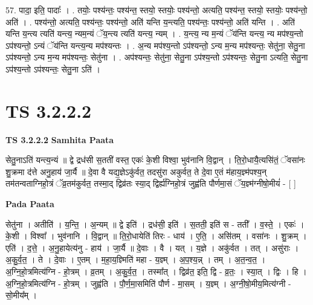 \documentclass[17pt]{extarticle}
\begin{document}
57. पादा॒ इति॒ पादाः᳚ । . तयोः॒ पश्य॑न्तः॒ पश्य॑न्त॒ स्तयो॒ स्तयोः॒ पश्य॑न्तो॒ अत्यति॒ पश्य॑न्त॒ स्तयो॒ स्तयोः॒ पश्य॑न्तो॒ अति॑ । . पश्य॑न्तो॒ अत्यति॒ पश्य॑न्तः॒ पश्य॑न्तो॒ अति॑ यन्ति य॒न्त्यति॒ पश्य॑न्तः॒ पश्य॑न्तो॒ अति॑ यन्ति । . अति॑ यन्ति य॒न्त्य त्यति॑ यन्त्य॒ न्यम॒न्यं ॅय॒न्त्य त्यति॑ यन्त्य॒ न्यम् । . य॒न्त्य॒ न्य म॒न्यं ॅय॑न्ति यन्त्य॒ न्य मप॑श्य॒न्तो ऽप॑श्यन्तो॒ ऽन्यं ॅय॑न्ति यन्त्य॒न्य मप॑श्यन्तः । . अ॒न्य मप॑श्य॒न्तो ऽप॑श्यन्तो॒ ऽन्य म॒न्य मप॑श्यन्तः॒ सेतु॑ना॒ सेतु॒ना ऽप॑श्यन्तो॒ ऽन्य म॒न्य मप॑श्यन्तः॒ सेतु॑ना । . अप॑श्यन्तः॒ सेतु॑ना॒ सेतु॒ना ऽप॑श्य॒न्तो ऽप॑श्यन्तः॒ सेतु॒ना ऽत्यति॒ सेतु॒ना ऽप॑श्य॒न्तो ऽप॑श्यन्तः॒ सेतु॒ना ऽति॑ । \newline
\pagebreak
{}

\section{ TS 3.2.2.2 }

\textbf{TS 3.2.2.2 } \newline
\textbf{Samhita Paata} \newline

सेतु॒नाऽति॑ यन्त्य॒न्यं ॥ द्वे द्रध॑सी स॒तती॑ वस्त॒ एकः॑ के॒शी विश्वा॒ भुव॑नानि वि॒द्वान् । ति॒रो॒धायै॒त्यसि॑तं॒ ॅवसा॑नः शु॒क्रमा द॑त्ते अनु॒हाय॑ जा॒र्यै ॥ दे॒वा वै यद्य॒ज्ञेऽकु॑र्वत॒ तदसु॑रा अकुर्वत॒ ते दे॒वा ए॒तं म॑हाय॒ज्ञ्म॑पश्य॒न् तम॑तन्वताग्निहो॒त्रं ॅव्र॒तम॑कुर्वत॒ तस्मा॒द् द्विव्र॑तः स्या॒द् द्विर्ह्य॑ग्निहो॒त्रं जुह्व॑ति पौर्णमा॒सं ॅय॒ज्ञ्म॑ग्नीषो॒मीयं॑ - [  ] \newline

\textbf{Pada Paata} \newline

सेतु॑ना । अतीति॑ । य॒न्ति॒ । अ॒न्यम् ॥ द्वे इति॑ । द्रध॑सी॒ इति॑ । स॒तती॒ इति॑ स - तती᳚ । व॒स्ते॒ । एकः॑ । के॒शी । विश्वा᳚ । भुव॑नानि । वि॒द्वान् ॥ ति॒रो॒धायेति॑ तिरः - धाय॑ । ए॒ति॒ । असि॑तम् । वसा॑नः । शु॒क्रम् । एति॑ । द॒त्ते॒ । अ॒नु॒हायेत्य॑नु - हाय॑ । जा॒र्यै ॥ दे॒वाः । वै । यत् । य॒ज्ञे । अकु॑र्वत । तत् । असु॑राः । अ॒कु॒र्व॒त॒ । ते । दे॒वाः । ए॒तम् । म॒हा॒य॒ज्ञ्मिति॑ महा - य॒ज्ञ्म् । अ॒प॒श्य॒न्न् । तम् । अ॒त॒न्व॒त॒ । अ॒ग्नि॒हो॒त्रमित्य॑ग्नि - हो॒त्रम् । व्र॒तम् । अ॒कु॒र्व॒त॒ । तस्मा᳚त् । द्विव्र॑त॒ इति॒ द्वि - व्र॒तः॒ । स्या॒त् । द्विः । हि । अ॒ग्नि॒हो॒त्रमित्य॑ग्नि - हो॒त्रम् । जुह्व॑ति । पौ॒र्ण॒मा॒समिति॑ पौर्ण - मा॒सम् । य॒ज्ञ्म् । अ॒ग्नी॒षो॒मीय॒मित्य॑ग्नी - सो॒मीय᳚म् ।  \newline
\end{document}
